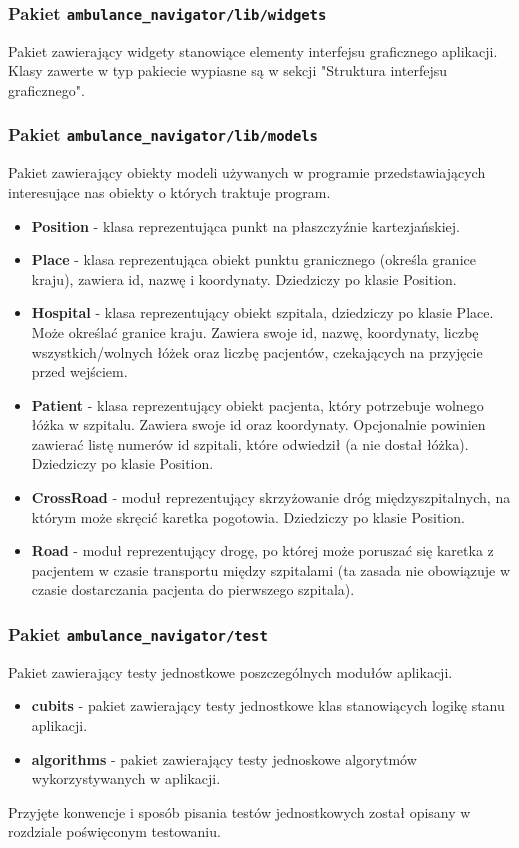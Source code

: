 \documentclass{article}
\begin{document}
\subsubsection{Pakiet \texttt{ambulance\_navigator/lib/widgets}}
Pakiet zawierający widgety stanowiące elementy interfejsu graficznego aplikacji. Klasy zawerte w typ pakiecie wypiasne są w sekcji "Struktura interfejsu graficznego".

\subsubsection{Pakiet \texttt{ambulance\_navigator/lib/models}}
Pakiet zawierający obiekty modeli używanych w programie przedstawiających interesujące nas obiekty o których traktuje program.
\begin{itemize}
\item \textbf{Position} - klasa reprezentująca punkt na płaszczyźnie kartezjańskiej.

\item \textbf{Place} - klasa reprezentująca obiekt punktu granicznego (określa granice kraju), zawiera id, nazwę i koordynaty. Dziedziczy po klasie Position.

\item \textbf{Hospital} - klasa reprezentujący obiekt szpitala, dziedziczy po klasie Place. Może określać granice kraju. Zawiera swoje id, nazwę, koordynaty, liczbę wszystkich/wolnych łóżek oraz liczbę pacjentów, czekających na przyjęcie przed wejściem.

\item \textbf{Patient} - klasa reprezentujący obiekt pacjenta, który potrzebuje wolnego łóżka w szpitalu. Zawiera swoje id oraz koordynaty. Opcjonalnie powinien zawierać listę numerów id szpitali, które odwiedził (a nie dostał łóżka). Dziedziczy po klasie Position.

\item \textbf{CrossRoad} - moduł reprezentujący skrzyżowanie dróg międzyszpitalnych, na którym może skręcić karetka pogotowia. Dziedziczy po klasie Position.

\item \textbf{Road} - moduł reprezentujący drogę, po której może poruszać się karetka z pacjentem w czasie transportu między szpitalami (ta zasada nie obowiązuje w czasie dostarczania pacjenta do pierwszego szpitala).
\end{itemize}

\subsubsection{Pakiet \texttt{ambulance\_navigator/test}}
Pakiet zawierający testy jednostkowe poszczególnych modułów aplikacji.
\begin{itemize}
\item \textbf{cubits} - pakiet zawierający testy jednostkowe klas stanowiących logikę stanu aplikacji.
\item \textbf{algorithms} - pakiet zawierający testy jednoskowe algorytmów wykorzystywanych w aplikacji.
\end{itemize}
Przyjęte konwencje i sposób pisania testów jednostkowych został opisany w rozdziale poświęconym testowaniu.
\end{document}
